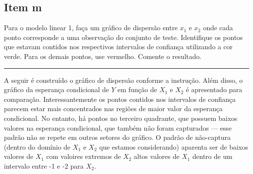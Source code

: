 \documentclass[
  a4paperpaper,
]{article}
\begin{document}
\subsection{Item m}\label{item-m}

Para o modelo linear 1, faça um gráfico de dispersão entre \(x_1\) e
\(x_2\) onde cada ponto corresponde a uma observação do conjunto de
teste. Identifique os pontos que estavam contidos nos respectivos
intervalos de confiança utilizando a cor verde. Para os demais pontos,
use vermelho. Comente o resultado.

\begin{center}\rule{0.5\linewidth}{0.5pt}\end{center}

A seguir é construído o gráfico de dispersão conforme a instrução. Além
disso, o gráfico da esperança condicional de \(Y\) em função de \(X_1\)
e \(X_2\) é apresentado para comparação. Interessantemente os pontos
contidos nos intervalos de confiança parecem estar mais concentrados nas
regiões de maior valor da esperança condicional. No entanto, há pontos
no terceiro quadrante, que possuem baixos valores na esperança
condicional, que também não foram capturados --- esse padrão não se
repete em outros setores do gráfico. O padrão de não-captura (dentro do
domínio de \(X_1\) e \(X_2\) que estamos considerando) aparenta ser de
baixos valores de \(X_1\) com valoires extremos de \(X_2\) altos valores
de \(X_1\) dentro de um intervalo entre -1 e -2 para \(X_2\).
\end{document}
